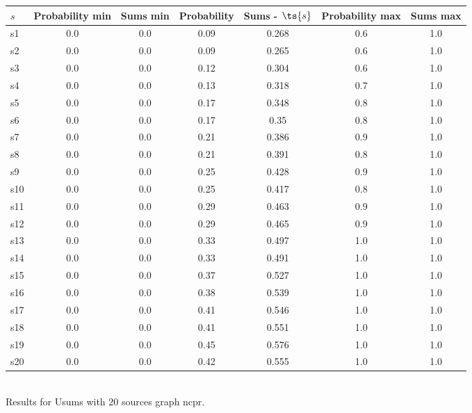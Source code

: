 \documentclass{article}
\begin{document}
\noindent\begin{tabular}{|l|c|c|c|c|c|c|}
\hline
$s$& Probability min & Sums min & Probability & Sums - $\ts{s}$ & Probability max & Sums max\\
\hline
s1 &0.0 & 0.0 & 0.09 & 0.268 & 0.6 & 1.0\\
\hline
s2 &0.0 & 0.0 & 0.09 & 0.265 & 0.6 & 1.0\\
\hline
s3 &0.0 & 0.0 & 0.12 & 0.304 & 0.6 & 1.0\\
\hline
s4 &0.0 & 0.0 & 0.13 & 0.318 & 0.7 & 1.0\\
\hline
s5 &0.0 & 0.0 & 0.17 & 0.348 & 0.8 & 1.0\\
\hline
s6 &0.0 & 0.0 & 0.17 & 0.35 & 0.8 & 1.0\\
\hline
s7 &0.0 & 0.0 & 0.21 & 0.386 & 0.9 & 1.0\\
\hline
s8 &0.0 & 0.0 & 0.21 & 0.391 & 0.8 & 1.0\\
\hline
s9 &0.0 & 0.0 & 0.25 & 0.428 & 0.9 & 1.0\\
\hline
s10 &0.0 & 0.0 & 0.25 & 0.417 & 0.8 & 1.0\\
\hline
s11 &0.0 & 0.0 & 0.29 & 0.463 & 0.9 & 1.0\\
\hline
s12 &0.0 & 0.0 & 0.29 & 0.465 & 0.9 & 1.0\\
\hline
s13 &0.0 & 0.0 & 0.33 & 0.497 & 1.0 & 1.0\\
\hline
s14 &0.0 & 0.0 & 0.33 & 0.491 & 1.0 & 1.0\\
\hline
s15 &0.0 & 0.0 & 0.37 & 0.527 & 1.0 & 1.0\\
\hline
s16 &0.0 & 0.0 & 0.38 & 0.539 & 1.0 & 1.0\\
\hline
s17 &0.0 & 0.0 & 0.41 & 0.546 & 1.0 & 1.0\\
\hline
s18 &0.0 & 0.0 & 0.41 & 0.551 & 1.0 & 1.0\\
\hline
s19 &0.0 & 0.0 & 0.45 & 0.576 & 1.0 & 1.0\\
\hline
s20 &0.0 & 0.0 & 0.42 & 0.555 & 1.0 & 1.0\\
\hline
\end{tabular}\\

\noindent Results for Usums with 20 sources graph ncpr.
\end{document}
